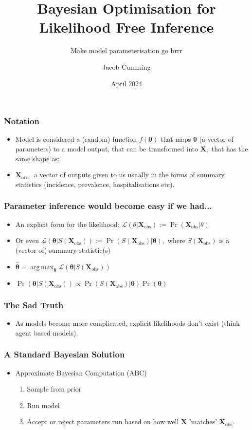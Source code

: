 \documentclass{beamer}
\title[BOLFI]{Bayesian Optimisation for Likelihood Free Inference}
\subtitle{Make model parameterisation go brrr}
\author{Jacob Cumming}
\institute{University of Melbourne, Walter and Eliza Hall Institute}
\date{April 2024}
\DeclareMathOperator*{\argmax}{arg\,max}
\begin{document}
\frame{\titlepage}

\begin{frame}
    \frametitle{Notation}
    \begin{itemize}
        \item Model is considered a (random) function $f(\bm{\theta})$ that maps $\bm{\theta}$ (a vector of parameters) to a model output, that can be transformed into $\mathbf{X},$ that has the same shape as:
        \item $\mathbf{X}_\text{obs},$ a vector of outputs given to us usually in the forms of summary statistics (incidence, prevalence, hospitalisations etc).
    \end{itemize}
\end{frame}

\begin{frame}
    \frametitle{Parameter inference would become easy if we had...}
    \begin{itemize}
        \item An explicit form for the likelihood: $\mathcal{L}({\theta}|\mathbf{X}_\text{obs}) := \Pr(\mathbf{X}_\text{obs} | \theta)$
        \item <2-> Or even $\mathcal{L}(\bm{\theta}|S(\mathbf{X}_\text{obs})) := \Pr(S(\mathbf{X}_\text{obs}) | \bm\theta),$ where $S(\mathbf{X}_\text{obs})$ is a (vector of) summary statistic(s)
        \item <3-> $\hat{\bm{\theta}} = \argmax_{\bm{\theta}} \mathcal{L}(\bm{\theta}|S(\mathbf{X}_\text{obs}))$
        \item <4-> $\Pr(\bm{\theta}|S(\mathbf{X}_\text{obs})) \propto \Pr(S(\mathbf{X}_\text{obs})| \bm\theta)\Pr(\bm{\theta})$
    \end{itemize}
\end{frame}

\begin{frame}
    \frametitle{The Sad Truth}
    \begin{itemize}
        \item As models become more complicated, explicit likelihoods don't exist (think agent based models).
    \end{itemize}
\end{frame}

\begin{frame}
    \frametitle{A Standard Bayesian Solution}
    \begin{itemize}
        \item Approximate Bayesian Computation (ABC)\begin{enumerate}
                  \item Sample from prior
                  \item Run model
                  \item Accept or reject parameters run based on how well $\mathbf{X}$ 'matches' $\mathbf{X}_\text{obs}.$
              \end{enumerate}
    \end{itemize}
\end{frame}
\end{document}
